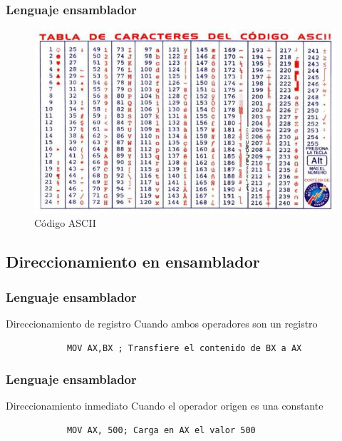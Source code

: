 \documentclass{beamer}
\begin{document}
\begin{frame}
	\frametitle{Lenguaje ensamblador}
	\begin{center}
		\begin{figure}[H]
			\centering
			\includegraphics[scale=0.6]{imagenes/ASCII.jpg}
			\caption{Código ASCII}
		\end{figure}
	\end{center}
\end{frame}

\subsection{Direccionamiento en ensamblador}


\begin{frame}[fragile]
	\frametitle{Lenguaje ensamblador}
	\begin{block}{Direccionamiento de registro}
		Cuando ambos operadores son un registro
		\begin{lstlisting}
			MOV AX,BX ; Transfiere el contenido de BX a AX
		\end{lstlisting}
	\end{block}		 		
\end{frame}



\begin{frame}[fragile]
	\frametitle{Lenguaje ensamblador}
	\begin{block}{Direccionamiento inmediato}
		Cuando el operador origen es una constante
		\begin{lstlisting}
			MOV AX, 500; Carga en AX el valor 500
		\end{lstlisting}
	\end{block}		 		
\end{frame}
\end{document}
